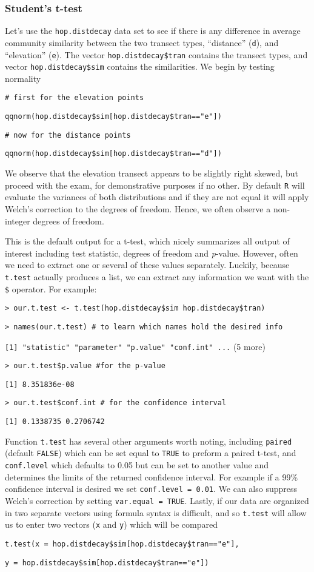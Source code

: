 \documentclass[12pt]{article}
\newcommand{\R}[1] {
	\item \texttt{#1}
}
\newenvironment{verbatim}{ 
	\indent
	\begin{list}{}{\setlength{\itemsep}{-1.5mm}}
}{
	\end{list}
}
\begin{document}
\subsubsection{Student's t-test}	\label{sec:tTest}
Let's use the \verb+hop.distdecay+ data set to see if there is any difference in average community similarity between the two transect types, ``distance'' (\verb+d+), and ``elevation'' (\verb+e+).  The vector \verb+hop.distdecay$tran+ contains the transect types, and vector \verb+hop.distdecay$sim+ contains the similarities.  We begin by testing normality
\begin{verbatim}
	\R{\# first for the elevation points}
	\R{qqnorm(hop.distdecay\$sim[hop.distdecay\$tran=="e"])}
	\R{\# now for the distance points}
	\R{qqnorm(hop.distdecay\$sim[hop.distdecay\$tran=="d"])}
\end{verbatim}
We observe that the elevation transect appears to be slightly right skewed, but proceed with the exam, for demonstrative purposes if no other.  By default \verb+R+ will evaluate the variances of both distributions and if they are not equal it will apply Welch's correction to the degrees of freedom.  Hence, we often observe a non-integer degrees of freedom.
\begin{quote}
	
\end{quote}
This is the default output for a t-test, which nicely summarizes all output of interest including test statistic, degrees of freedom and \emph{p}-value.  However, often we need to extract one or several of these values separately.  Luckily, because \verb+t.test+ actually produces a list, we can extract any information we want with the \verb+$+ operator.  For example:
\begin{verbatim}
	\R{> our.t.test <- t.test(hop.distdecay\$sim~hop.distdecay\$tran)}
	\R{> names(our.t.test) \# to learn which names hold the desired info}
	\R{[1] "statistic"   "parameter"   "p.value"     "conf.int" ...} (5 more)
	\R{> our.t.test\$p.value  \#for the p-value}
	\R{[1]  8.351836e-08}
	\R{> our.t.test\$conf.int  \# for the confidence interval}
	\R{[1] 0.1338735 0.2706742}
\end{verbatim}
Function \verb+t.test+ has several other arguments worth noting, including \verb+paired+ (default \verb+FALSE+) which can be set equal to \verb+TRUE+ to preform a paired t-test, and \verb+conf.level+ which defaults to 0.05 but can be set to another value and determines the limits of the returned confidence interval.  For example if a 99\% confidence interval is desired we set \verb+conf.level = 0.01+.  We can also suppress Welch's correction by setting \verb+var.equal = TRUE+.  Lastly, if our data are organized in two separate vectors using formula syntax is difficult, and so \verb+t.test+ will allow us to enter two vectors (\verb+x+ and \verb+y+) which will be compared
\begin{verbatim}
	\R{t.test(x = hop.distdecay\$sim[hop.distdecay\$tran=="e"],}
	\R{y =  hop.distdecay\$sim[hop.distdecay\$tran=="e"])}
\end{verbatim}
\end{document}
